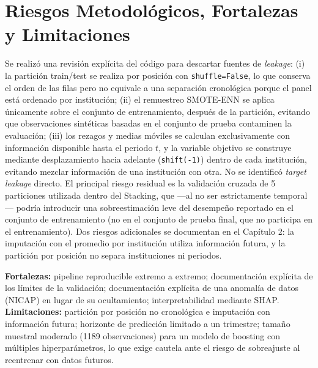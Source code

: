 \section{Riesgos Metodológicos, Fortalezas y Limitaciones}
Se realizó una revisión explícita del código para descartar fuentes de \textit{leakage}: (i) la partición train/test se realiza por posición con \texttt{shuffle=False}, lo que conserva el orden de las filas pero no equivale a una separación cronológica porque el panel está ordenado por institución; (ii) el remuestreo SMOTE-ENN se aplica únicamente sobre el conjunto de entrenamiento, después de la partición, evitando que observaciones sintéticas basadas en el conjunto de prueba contaminen la evaluación; (iii) los rezagos y medias móviles se calculan exclusivamente con información disponible hasta el periodo $t$, y la variable objetivo se construye mediante desplazamiento hacia adelante (\texttt{shift(-1)}) dentro de cada institución, evitando mezclar información de una institución con otra. No se identificó \textit{target leakage} directo. El principal riesgo residual es la validación cruzada de 5 particiones utilizada dentro del Stacking, que —al no ser estrictamente temporal— podría introducir una sobreestimación leve del desempeño reportado en el conjunto de entrenamiento (no en el conjunto de prueba final, que no participa en el entrenamiento). Dos riesgos adicionales se documentan en el Capítulo 2: la imputación con el promedio por institución utiliza información futura, y la partición por posición no separa instituciones ni periodos.

\textbf{Fortalezas:} pipeline reproducible extremo a extremo; documentación explícita de los límites de la validación; documentación explícita de una anomalía de datos (NICAP) en lugar de su ocultamiento; interpretabilidad mediante SHAP. \textbf{Limitaciones:} partición por posición no cronológica e imputación con información futura; horizonte de predicción limitado a un trimestre; tamaño muestral moderado (1189 observaciones) para un modelo de boosting con múltiples hiperparámetros, lo que exige cautela ante el riesgo de sobreajuste al reentrenar con datos futuros.

